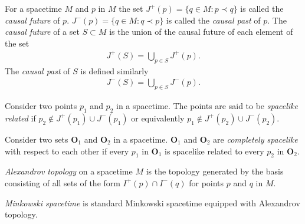 \begin{definition}
    \label{def:causal-future-and-causal-past}
    For a spacetime $M$ and $p$ in $M$ the set $J^+(p) = \{q \in M : p \prec q\}$ is called the \textit{causal future} of $p$. $J^-(p) = \{q \in M : q \prec p\}$ is called the \textit{causal past} of $p$. The \textit{causal future} of a set $S \subset M$ is the union of the causal future of each element of the set
    \begin{align}
        J^+(S) = \bigcup\limits_{p \in S} J^+(p).
    \end{align}
    The \textit{causal past} of $S$ is defined similarly
    \begin{align}
        J^-(S) = \bigcup\limits_{p \in S} J^-(p).
    \end{align}
\end{definition}

\begin{definition}
    \label{def:spacelike-related}
    Consider two points $p_1$ and $p_2$ in a spacetime. The points are said to be \textit{spacelike related} if $p_2 \notin J^+(p_1) \cup J^-(p_1)$ or equivalently $p_1 \notin J^+(p_2) \cup J^-(p_2)$.
\end{definition}

\begin{definition}
    \label{def:completely-spacelike}
    Consider two sets $\mathbf{O}_1$ and $\mathbf{O}_2$ in a spacetime. $\mathbf{O}_1$ and $\mathbf{O}_2$ are \textit{completely spacelike}  with respect to each other if every $p_1$ in $\mathbf{O}_1$ is spacelike related to every $p_2$ in $\mathbf{O}_2$.
\end{definition}

\begin{definition}
    \label{def:alexandrov-topology}
    \textit{Alexandrov topology} on a spacetime $M$ is the topology generated by the basis consisting of all sets of the form $I^+(p) \cap I^-(q)$ for points $p$ and $q$ in $M$.
\end{definition}

\begin{definition}
    \label{def:minkowski-spacetime}
    \textit{Minkowski spacetime} is standard Minkowski spacetime equipped with Alexandrov topology.
\end{definition}

